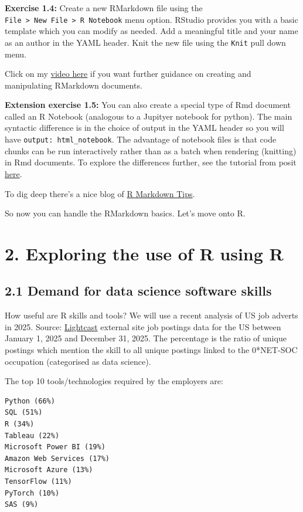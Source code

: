 \documentclass[
]{article}
\begin{document}
\textbf{Exercise 1.4:} Create a new RMarkdown file using the
\texttt{File\ \textgreater{}\ New\ File\ \textgreater{}\ R\ Notebook}
menu option. RStudio provides you with a basic template which you can
modify as needed. Add a meaningful title and your name as an author in
the YAML header. Knit the new file using the \texttt{Knit} pull down
menu.

Click on my
\href{https://www.loom.com/share/13100c7fb0ef4e9cb453e1ed12ac73c8}{video
here} if you want further guidance on creating and manipulating
RMarkdown documents.

\textbf{Extension exercise 1.5:} You can also create a special type of
Rmd document called an R Notebook (analogous to a Jupityer notebook for
python). The main syntactic difference is in the choice of output in the
YAML header so you will have \texttt{output:\ html\_notebook}. The
advantage of notebook files is that code chunks can be run interactively
rather than as a batch when rendering (knitting) in Rmd documents. To
explore the differences further, see the tutorial from posit
\href{https://rmarkdown.rstudio.com/lesson-10.html}{here}.

To dig deep there's a nice blog of
\href{https://appsilon.com/r-markdown-tips/}{R Markdown Tips}.

So now you can handle the RMarkdown basics. Let's move onto R.

\section{2. Exploring the use of R using R}\label{WS2}

\subsection{2.1 Demand for data science software
skills}\label{demand-for-data-science-software-skills}

How useful are R skills and tools? We will use a recent analysis of US
job adverts in 2025. Source:
\href{https://www.onetonline.org/link/demand/15-2051.00}{Lightcast}
external site job postings data for the US between January 1, 2025 and
December 31, 2025. The percentage is the ratio of unique postings which
mention the skill to all unique postings linked to the 0*NET-SOC
occupation (categorised as data science).

The top 10 tools/technologies required by the employers are:

\begin{verbatim}
Python (66%)
SQL (51%)
R (34%)
Tableau (22%)
Microsoft Power BI (19%)
Amazon Web Services (17%)
Microsoft Azure (13%)
TensorFlow (11%)
PyTorch (10%)
SAS (9%)
\end{verbatim}
\end{document}
